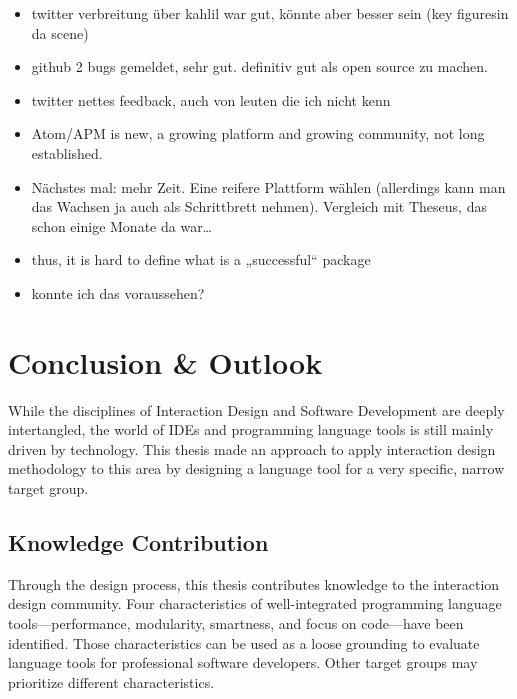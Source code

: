 \begin{itemize}
\itemsep1pt\parskip0pt
\item
  twitter verbreitung über kahlil war gut, könnte aber besser sein (key
  figuresin da scene)
\item
  github 2 bugs gemeldet, sehr gut. definitiv gut als open source zu
  machen.
\item
  twitter nettes feedback, auch von leuten die ich nicht kenn
\end{itemize}

\begin{itemize}
\item
  Atom/APM is new, a growing platform and growing community, not long
  established.
\item
  Nächstes mal: mehr Zeit. Eine reifere Plattform wählen (allerdings
  kann man das Wachsen ja auch als Schrittbrett nehmen). Vergleich mit
  Theseus, das schon einige Monate da war\ldots{}
\item
  thus, it is hard to define what is a „successful“ package
\item
  konnte ich das voraussehen?
\end{itemize}

\chapter{Conclusion \& Outlook}\label{conclusion-outlook}

While the disciplines of Interaction Design and Software Development are
deeply intertangled, the world of IDEs and programming language tools is
still mainly driven by technology. This thesis made an approach to apply
interaction design methodology to this area by designing a language tool
for a very specific, narrow target group.

\section{Knowledge Contribution}\label{knowledge-contribution}

Through the design process, this thesis contributes knowledge to the
interaction design community. Four characteristics of well-integrated
programming language tools—performance, modularity, smartness, and focus
on code—have been identified. Those characteristics can be used as a
loose grounding to evaluate language tools for professional software
developers. Other target groups may prioritize different
characteristics.

